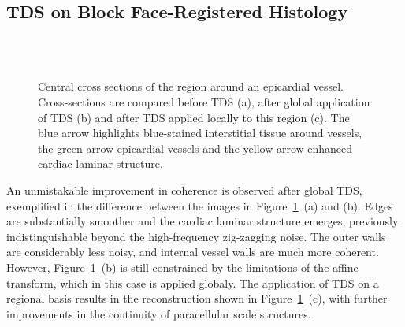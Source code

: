   \subsection{TDS on Block Face-Registered Histology} %
  \label{sub:tds_on_block_face_registered_histology}
  \begin{figure}[!t]
    \centering
    \\
    \\
    \caption{Central cross sections of the region around an epicardial vessel. Cross-sections are compared before TDS (a), after global application of TDS (b) and after TDS applied locally to this region (c). The blue arrow highlights blue-stained interstitial tissue around vessels, the green arrow epicardial vessels and the yellow arrow enhanced cardiac laminar structure.}
    \label{fig:vessel_sections}
  \end{figure}
  An unmistakable improvement in coherence is observed after global TDS, exemplified in the difference between the images in Figure~\ref{fig:vessel_sections}~(a) and (b). Edges are substantially smoother and the cardiac laminar structure emerges, previously indistinguishable beyond the high-frequency zig-zagging noise. The outer walls are considerably less noisy, and internal vessel walls are much more coherent. However, Figure~\ref{fig:vessel_sections}~(b) is still constrained by the limitations of the affine transform, which in this case is applied globaly. The application of TDS on a regional basis results in the reconstruction shown in Figure~\ref{fig:vessel_sections}~(c), with further improvements in the continuity of paracellular scale structures. 

